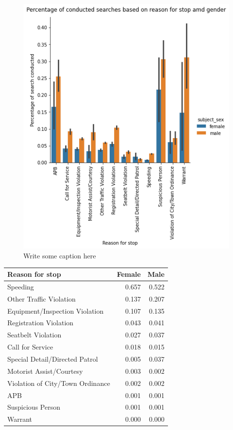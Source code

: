 \documentclass{article}
\begin{document}
\begin{figure}[h]
\includegraphics[scale=0.34, valign=t]{../figures/search_reason_gender.png}
\caption{Write some caption here}
\end{figure}   
\FloatBarrier


\begin{tabular}{lrr}
\toprule
                  Reason for stop & Female & Male \\
\midrule
                        Speeding &  0.657 & 0.522 \\
         Other Traffic Violation &  0.137 & 0.207 \\
  Equipment/Inspection Violation &  0.107 & 0.135 \\
          Registration Violation &  0.043 & 0.041 \\
              Seatbelt Violation &  0.027 & 0.037 \\
                Call for Service &  0.018 & 0.015 \\
  Special Detail/Directed Patrol &  0.005 & 0.037 \\
        Motorist Assist/Courtesy &  0.003 & 0.002 \\
Violation of City/Town Ordinance &  0.002 & 0.002 \\
                             APB &  0.001 & 0.001 \\
               Suspicious Person &  0.001 & 0.001 \\
                         Warrant &  0.000 & 0.000 \\
\bottomrule
\end{tabular}
\end{document}
